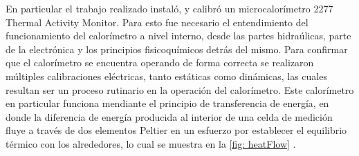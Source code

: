 	En particular el trabajo realizado instal\'o, y calibr\'o un microcalorímetro 2277 Thermal Activity Monitor. Para esto fue necesario el entendimiento del funcionamiento del calorímetro a nivel interno, desde las partes hidra\'ulicas, parte de la electrónica y los principios fisicoquímicos detrás del mismo. Para confirmar que el calor\'imetro se encuentra operando de forma correcta se realizaron m\'ultiples calibraciones el\'ectricas, tanto est\'aticas como din\'amicas, las cuales resultan ser un proceso rutinario en la operaci\'on del calor\'imetro. Este calor\'imetro en particular funciona mendiante el principio de transferencia de energ\'ia, en donde la diferencia de energ\'ia producida al interior de una celda de medici\'on fluye a trav\'es de dos elementos Peltier en un esfuerzo por establecer el equilibrio t\'ermico con los alrededores, lo cual se muestra en la \autoref{fig: heatFlow} \cite{Suurkuusk}.
